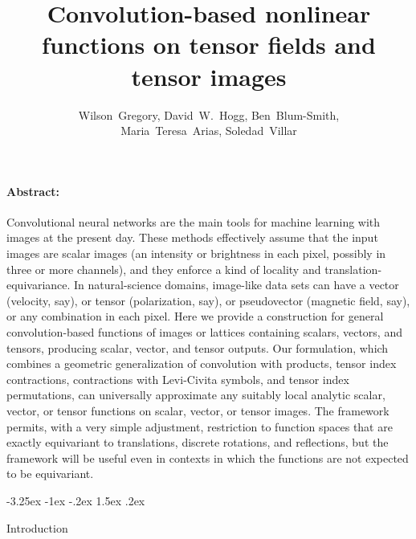 \documentclass{article}
\title{\bfseries%
Convolution-based nonlinear functions on tensor fields and tensor images}
\author{%
Wilson~Gregory,
David~W.~Hogg,
Ben~Blum-Smith,
\\
Maria~Teresa~Arias,
Soledad~Villar
}
\date{}
\makeatletter
\theoremstyle{definition}
\renewcommand\section{\@startsection {section}{1}{\z@}%
  {-3.25ex \@plus -1ex \@minus -.2ex}%
  {1.5ex \@plus .2ex}%
  {\raggedright\normalfont\large\bfseries}}%
\makeatother
\begin{document}
\maketitle\thispagestyle{empty}

\paragraph{Abstract:}
Convolutional neural networks are the main tools for machine learning with images at the present day.
These methods effectively assume that the input images are scalar images (an intensity or brightness in each pixel, possibly in three or more channels), and they enforce a kind of locality and translation-equivariance.
In natural-science domains, image-like data sets can have a vector (velocity, say), or tensor (polarization, say), or pseudovector (magnetic field, say), or any combination in each pixel.
Here we provide a construction for general convolution-based functions of images or lattices
containing scalars, vectors, and tensors, producing scalar, vector, and tensor outputs.
Our formulation, which combines a geometric generalization of convolution with products, tensor index contractions, contractions with Levi-Civita symbols, and tensor index permutations, can universally approximate any suitably local analytic scalar, vector, or tensor functions on scalar, vector, or tensor images.
The framework permits, with a very simple adjustment, restriction to function spaces that are exactly equivariant to translations, discrete rotations, and reflections, but the framework will be useful even in contexts in which the functions are not expected to be equivariant.

\section{Introduction}
\end{document}
